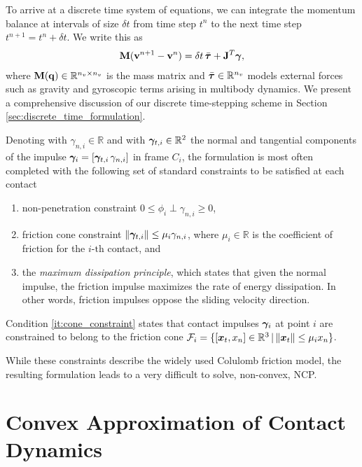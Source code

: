 To arrive at a discrete time system of equations, we can integrate the
momentum balance at intervals of size $\delta t$ from time step $t^n$ to the
next time step $t^{n+1}=t^n+\delta t$. We write this as
\begin{eqnarray}
	\mf{M}(\mf{v}^{n+1}-\mf{v}^n)  = \delta t\,\bar{\vf{\tau}} + \mf{J}^T\mf{\bgamma},
	\label{eq:momentum_balance}
\end{eqnarray}
where ${\mathbf{M}}({\mathbf{q}})\in\mathbb{R}^{n_v\times n_v}$ is the mass matrix and
$\bar{{\bm{\tau}}}\in\mathbb{R}^{n_v}$ models external forces such as gravity and
gyroscopic terms arising in multibody dynamics.
We present a
comprehensive discussion of our discrete time-stepping scheme in Section
\ref{sec:discrete_time_formulation}.

Denoting with $\gamma_{n,i} \in \mathbb{R}$ and with ${\bm\gamma}_{t,i} \in
\mathbb{R}^2$ the normal and tangential components of the impulse
${\bm\gamma}_i=[{\bm\gamma}_{t,i}\,\gamma_{n,i}]$ in frame $C_i$, the formulation is
most often completed with the following set of standard constraints to be
satisfied at each contact
\begin{enumerate}
	\item non-penetration constraint $0\le\phi_i\perp\gamma_{n,i}\ge0$,
	\item\label{it:cone_constraint} friction cone constraint
	$\Vert{\bm\gamma}_{t,i}\Vert\le \mu_i\gamma_{n,i}$,
    where $\mu_i \in \mathbb{R}$ is the coefficient of friction for the
    $i\text{-th}$ contact, and
	\item the \emph{maximum dissipation principle}, which states that given the
	normal impulse, the friction impulse maximizes the rate of energy
	dissipation. In other words, friction impulses oppose the sliding velocity
	direction.
\end{enumerate}
Condition \ref{it:cone_constraint} states that contact
impulses ${\bm\gamma}_i$ at point $i$ are constrained to belong to the friction cone
$\mathcal{F}_i=\{[{\bm{x}}_t, x_n] \in\mathbb{R}^3 \,|\, \Vert{\bm{x}}_t\Vert\le
\mu_i x_n\}$.

While these constraints describe the widely used Colulomb friction model, the
resulting formulation leads to a very difficult to solve, non-convex, NCP.

\section{Convex Approximation of Contact Dynamics}
\label{sec:previous_work}

